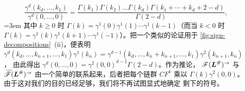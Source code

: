 \begin{equation*}
\frac{\gamma^d(k_d,\ldots,k_1)}{\gamma^d(0,\ldots,0)}
=\frac{\Gamma(k_1)\Gamma(k_2)\ldots\Gamma(k_d)\Gamma(k_1+\cdots+k_d+2-d)}
       {\Gamma(2-d)},
\end{equation*}
\begingroup{}\emergencystretch=3em
其中 $k\ge 0$ 时 $\Gamma(k)=\gamma^1(0)\gamma^1(1)\cdots\gamma^1(k-1)$（而当 $k<0$%
时 $\Gamma(k)=\gamma^1(k)\gamma^1(k+1)\cdots\gamma^1(-1)$）。把一个类似的论证用于%
\cref{fig:sign-decompositions}~(ii)，便表明 $\gamma^d(k_d,\ldots,k_{n+1},\ldots,k_1)%
\gamma^1(k_n)=\gamma^{d-1}(k_d,\ldots,k_n+k_{n+1},\ldots,k_1)\gamma^2(k_{n+1},k_n)$，%
由此得出 $\gamma^d(0,\ldots,0)=\gamma^2(0,0)^{d-1}\Gamma(2-d)$。作为推论，%
$\mathscr{F}(\boldsymbol{L}^{\#})^{\to}$ 与 $\widetilde{\mathscr{F}}(\boldsymbol{L}^{\#})^{\to}$%
由一个简单的\trLinear\trIsomorphism{}联系起来，后者把每个\trFloer{}链群 $CF^k$ 乘以%
$\Gamma(k)\gamma^2(0,0)$。由于这对我们的目的已经足够，我们将不再试图显式地确定%
剩下的符号。\par\endgroup
